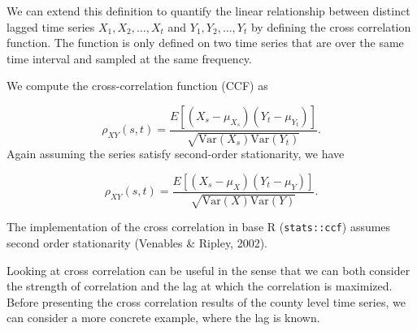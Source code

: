 \documentclass[12pt,twoside]{smiththesis}
\begin{document}
We can extend this definition to quantify the linear relationship between distinct lagged time series \(X_1, X_2, \dots, X_t\) and \(Y_1, Y_2, \dots, Y_t\) by defining the cross correlation function. The function is only defined on two time series that are over the same time interval and sampled at the same frequency.
\begin{tcolorbox}[title=Definition: Cross-Correlation]

We compute the cross-correlation function (CCF) as

$$\rho_{XY}(s,t) = \dfrac{E[(X_s - \mu_{X_s})(Y_t-\mu_{Y_t})]}{\sqrt{\text{Var}(X_s) \text{Var}(Y_t)}}.$$
Again assuming the series satisfy second-order stationarity, we have

$$\rho_{XY}(s,t) = \dfrac{E[(X_s - \mu_{X})(Y_t-\mu_{Y})]}{\sqrt{\text{Var}(X) \text{Var}(Y)}}.$$

\end{tcolorbox}
The implementation of the cross correlation in base R (\texttt{stats::ccf}) assumes second order stationarity (Venables \& Ripley, 2002).

Looking at cross correlation can be useful in the sense that we can both consider the strength of correlation and the lag at which the correlation is maximized. Before presenting the cross correlation results of the county level time series, we can consider a more concrete example, where the lag is known.
\end{document}
